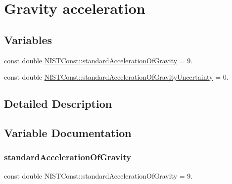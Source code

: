 \hypertarget{group___gravity_acceleration}{}\section{Gravity acceleration}
\label{group___gravity_acceleration}
\subsection*{Variables}
\begin{DoxyCompactItemize}
\item 
const double \hyperlink{group___gravity_acceleration_gad5bc5f7f030bc2c467a8430e00b42f5e}{N\+I\+S\+T\+Const\+::standard\+Acceleration\+Of\+Gravity} = 9.
\item 
const double \hyperlink{group___gravity_acceleration_gaabc6df92c25677a5b767445f101d4f57}{N\+I\+S\+T\+Const\+::standard\+Acceleration\+Of\+Gravity\+Uncertainty} = 0.
\end{DoxyCompactItemize}


\subsection{Detailed Description}


\subsection{Variable Documentation}
\mbox{\label{group___gravity_acceleration_gad5bc5f7f030bc2c467a8430e00b42f5e}} 
\subsubsection{\texorpdfstring{standard\+Acceleration\+Of\+Gravity}{standardAccelerationOfGravity}}
{\footnotesize\ttfamily const double N\+I\+S\+T\+Const\+::standard\+Acceleration\+Of\+Gravity = 9.}

